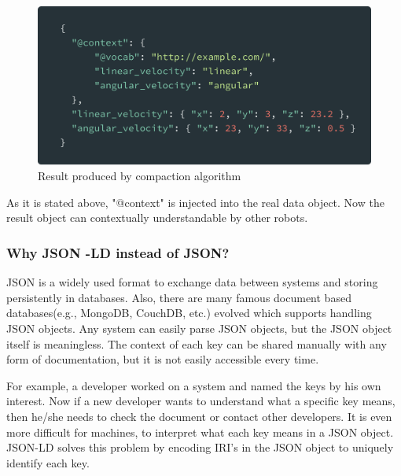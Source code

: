 	\begin{figure}[!htbp] 
		\begin{center}
			\includegraphics[scale=0.1]{./images/png/jsonld/compaction_3}	
			\caption{Result produced by compaction algorithm}	
			\label{fig:jsonld_compaction_3}	
		\end{center}
	\end{figure}	

	As it is stated above, "@context" is injected into the real data object. Now the result object can contextually understandable by other robots.
		
		
		\subsubsection{Why JSON -LD instead of JSON?}
		
		JSON is a widely used format to exchange data between systems and storing persistently in databases. Also, there are many famous document based databases(e.g., MongoDB, CouchDB, etc.) evolved which supports handling JSON objects. Any system can easily parse JSON objects, but the JSON object itself is meaningless. The context of each key can be shared manually with any form of documentation, but it is not easily accessible every time.
		
		For example, a developer worked on a system and named the keys by his own interest. Now if a new developer wants to understand what a specific key means, then he/she needs to check the document or contact other developers. It is even more difficult for machines, to interpret what each key means in a JSON object. JSON-LD solves this problem by encoding IRI's in the JSON object to uniquely identify each key.
		
		
	

